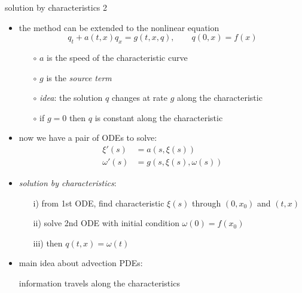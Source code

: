 \documentclass[10pt,dvipsnames,usepdftitle=false,
hyperref={pdftitle = {Finite volume methods},
    pdfauthor = {Ed Bueler}}]{beamer}
\begin{document}
\begin{frame}{solution by characteristics 2}

\begin{itemize}
\item the method can be extended to the nonlinear equation
     $$q_t + a(t,x) q_x = g(t,x,q), \qquad q(0,x) = f(x)$$

    \begin{itemize}
    \item[$\circ$] $a$ is the speed of the characteristic curve
    \item[$\circ$] $g$ is the \emph{source term}
    \item[$\circ$] \emph{idea}: the solution $q$ changes at rate $g$ along the characteristic
    \item[$\circ$] if $g=0$ then $q$ is constant along the characteristic
    \end{itemize}
\item now we have a pair of ODEs to solve:
\begin{align*}
\xi'(s) &= a(s,\xi(s)) \\
\omega'(s) &= g(s,\xi(s),\omega(s))
\end{align*}
\item \emph{solution by characteristics}:
    \begin{itemize}
    \item[i)] from 1st ODE, find characteristic $\xi(s)$ through $(0,x_0)$ and $(t,x)$
    \item[ii)] solve 2nd ODE with initial condition $\omega(0)=f(x_0)$
    \item[iii)] then $q(t,x) = \omega(t)$
    \end{itemize}
\item \alert{main idea} about advection PDEs:

\begin{center}
information travels along the characteristics
\end{center}
\end{itemize}
\end{frame}
\end{document}
